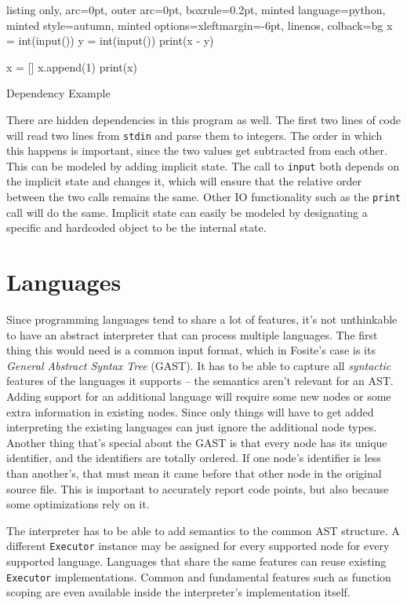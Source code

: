 \documentclass[a4paper, 16pt, oneside]{Thesis}
\begin{document}
\begin{code}
  \begin{tcblisting}{listing only, 
  arc=0pt,
  outer arc=0pt, 
  boxrule=0.2pt,
  minted language=python,
  minted style=autumn,
  minted options={xleftmargin=-6pt, linenos},
  colback=bg }
x = int(input())
y = int(input())
print(x - y)

x = []
x.append(1)
print(x)
\end{tcblisting}
\caption{Dependency Example} \label{smp:dep}
\end{code}

There are hidden dependencies in this program as well. The first two
lines of code will read two lines from \texttt{stdin} and parse them to
integers. The order in which this happens is important, since the two
values get subtracted from each other. This can be modeled by adding
implicit state. The call to \texttt{input} both depends on the implicit
state and changes it, which will ensure that the relative order between
the two calls remains the same. Other IO functionality such as the
\texttt{print} call will do the same. Implicit state can easily be
modeled by designating a specific and hardcoded object to be the
internal state.

\section{Languages}\label{languages}

Since programming languages tend to share a lot of features, it's not
unthinkable to have an abstract interpreter that can process multiple
languages. The first thing this would need is a common input format,
which in Fosite's case is its \emph{General Abstract Syntax Tree}
(GAST). It has to be able to capture all \emph{syntactic} features of
the languages it supports -- the semantics aren't relevant for an AST.
Adding support for an additional language will require some new nodes or
some extra information in existing nodes. Since only things will have to
get added interpreting the existing languages can just ignore the
additional node types. Another thing that's special about the GAST is
that every node has its unique identifier, and the identifiers are
totally ordered. If one node's identifier is less than another's, that
must mean it came before that other node in the original source file.
This is important to accurately report code points, but also because
some optimizations rely on it.

The interpreter has to be able to add semantics to the common AST
structure. A different \texttt{Executor} instance may be assigned for
every supported node for every supported language. Languages that share
the same features can reuse existing \texttt{Executor} implementations.
Common and fundamental features such as function scoping are even
available inside the interpreter's implementation itself.
\end{document}
